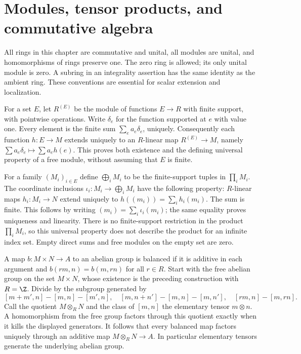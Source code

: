 \chapter{Modules, tensor products, and commutative algebra}\label{chap:M07.22}

All rings in this chapter are commutative and unital, all modules are
unital, and homomorphisms of rings preserve one. The zero ring is allowed;
its only unital module is zero. A subring in an integrality assertion has
the same identity as the ambient ring. These conventions are essential
for scalar extension and localization.

For a set $E$, let $R^{(E)}$ be the module of functions $E\to R$ with
finite support, with pointwise operations. Write $\delta_e$ for the
function supported at $e$ with value one. Every element is the finite sum
$\sum_e a_e\delta_e$, uniquely. Consequently each function $h:E\to M$
extends uniquely to an $R$-linear map
$R^{(E)}\to M$, namely $\sum a_e\delta_e\mapsto\sum a_eh(e)$.
This proves both existence and the defining universal property of a free
module, without assuming that $E$ is finite.

For a family $(M_i)_{i\in E}$ define $\bigoplus_iM_i$ to be the
finite-support tuples in $\prod_iM_i$. The coordinate inclusions
$\iota_i:M_i\to\bigoplus_iM_i$ have the following property: $R$-linear maps
$h_i:M_i\to N$ extend uniquely to
$h((m_i))=\sum_i h_i(m_i)$. The sum is finite. This follows by writing
$(m_i)=\sum_i\iota_i(m_i)$; the same equality proves uniqueness and
linearity. There is no finite-support restriction in the product
$\prod_iM_i$, so this universal property does not describe the product
for an infinite index set. Empty direct sums and free modules on the
empty set are zero.

A map $b:M\times N\to A$ to an abelian group is balanced if it is additive
in each argument and $b(rm,n)=b(m,rn)$ for all $r\in R$. Start with the
free abelian group on the set $M\times N$, whose existence is the preceding
construction with $R=\Z$. Divide by the subgroup generated by
\[
 [m+m',n]-[m,n]-[m',n],\quad
 [m,n+n']-[m,n]-[m,n'],\quad [rm,n]-[m,rn].
\]
Call the quotient $M\otimes_RN$ and the class of $[m,n]$ the elementary
tensor $m\otimes n$. A homomorphism from the free group factors through
this quotient exactly when it kills the displayed generators.
It follows that every balanced map factors uniquely through an additive
map $M\otimes_RN\to A$. In particular elementary tensors generate the
underlying abelian group.

